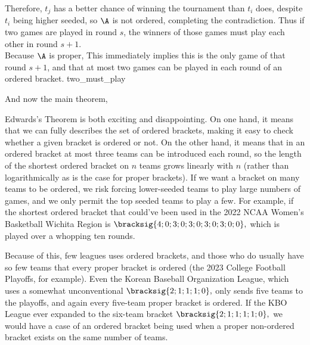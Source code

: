 {{    Therefore, $t_j$ has a better chance of winning the tournament than $t_i$ does, despite $t_i$ being higher seeded, so $\A$ is not ordered, completing the contradiction. Thus if two games are played in round $s$, the winners of those games must play each other in round $s+1.$\\

    Because $\A$ is proper, This immediately implies this is the only game of that round $s+1$, and that at most two games can be played in each round of an ordered bracket.
}{two_must_play}

And now the main theorem,


Edwards's Theorem is both exciting and disappointing. On one hand, it means that we can fully describes the set of ordered brackets, making it easy to check whether a given bracket is ordered or not. On the other hand, it means that in an ordered bracket at most three teams can be introduced each round, so the length of the shortest ordered bracket on $n$ teams grows linearly with $n$ (rather than logarithmically as is the case for proper brackets). If we want a bracket on many teams to be ordered, we risk forcing lower-seeded teams to play large numbers of games, and we only permit the top seeded teams to play a few. For example, if the shortest ordered bracket that could've been used in the 2022 NCAA Women's Basketball Wichita Region is $\bracksig{4; 0; 3; 0; 3; 0; 3; 0; 3; 0; 0},$ which is played over a whopping ten rounds.


Because of this, few leagues uses ordered brackets, and those who do usually have so few teams that every proper bracket is ordered (the 2023 College Football Playoffs, for example). Even the Korean Baseball Organization League, which uses a somewhat unconventional $\bracksig{2; 1; 1; 1; 0},$ only sends five teams to the playoffs, and again every five-team proper bracket is ordered. If the KBO League ever expanded to the six-team bracket $\bracksig{2; 1; 1; 1; 1; 0},$ we would have a case of an ordered bracket being used when a proper non-ordered bracket exists on the same number of teams.

}
